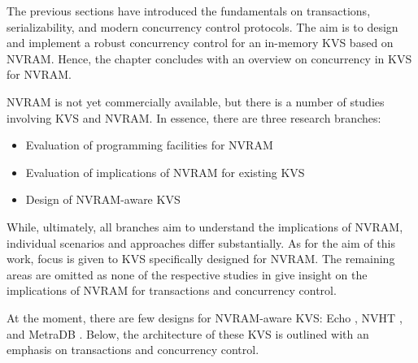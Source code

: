 The previous sections have introduced the fundamentals on transactions,
serializability, and modern concurrency control protocols. The aim is to design
and implement a robust concurrency control for an in-memory KVS based on NVRAM.
Hence, the chapter concludes with an overview on concurrency in KVS for NVRAM.

NVRAM is not yet commercially available, but there is a number of studies
involving KVS and NVRAM. In essence, there are three research branches:

\begin{itemize}
    \item Evaluation of programming facilities for NVRAM
    \item Evaluation of implications of NVRAM for existing KVS
    \item Design of NVRAM-aware KVS
\end{itemize}

While, ultimately, all branches aim to understand the implications of NVRAM,
individual scenarios and approaches differ substantially. As for the aim of this
work, focus is given to KVS specifically designed for NVRAM. The remaining areas
are omitted as none of the respective studies in
\cite{venkataraman2011consistent, pelley2013storage, volos2014aerie,
lersch2017analysis, malinowski2017using} give insight on the implications of
NVRAM for transactions and concurrency control.


At the moment, there are few designs for NVRAM-aware KVS: Echo
\cite{bailey2013exploring}, NVHT \cite{zhou2016nvht}, and MetraDB
\cite{marmol2016nonvolatile}. Below, the architecture of these KVS is outlined
with an emphasis on transactions and concurrency control.

